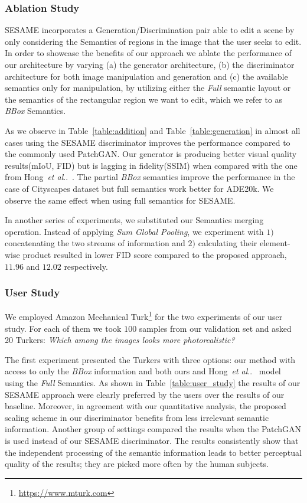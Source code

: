 \documentclass[runningheads]{llncs}
\makeatletter
\DeclareRobustCommand\onedot{\futurelet\@let@token\@onedot}
\def\@onedot{\ifx\@let@token.\else.\null\fi\xspace}
\def\etal{\emph{et al}\onedot}
\def\hong{Hong~\etal~\cite{hong2018learning}}
\newcommand{\tref}[1]{Table~\ref{#1}}
\makeatother
\begin{document}
\subsubsection{Ablation Study}
\label{ssc:ablation_study}


SESAME incorporates a Generation/Discrimination pair able to edit a scene by only considering the Semantics of regions in the image that the user seeks to edit. In order to showcase the benefits of our approach we ablate the performance of our architecture by varying (a) the generator architecture, (b) the discriminator architecture for both image manipulation and generation and (c) the available semantics only for manipulation, by utilizing either the \emph{Full} semantic layout or the semantics of the rectangular region we want to edit, which we refer to as \emph{BBox} Semantics. 

As we observe in \tref{table:addition} and \tref{table:generation} in almost all cases using the SESAME discriminator improves the performance compared to the commonly used PatchGAN. Our generator is producing better visual quality results(mIoU, FID) but is lagging in fidelity(SSIM) when compared with the one from \hong{}. The partial \emph{BBox} semantics improve the performance in the case of Cityscapes dataset but full semantics work better for ADE20k. We observe the same effect when using full semantics for SESAME. 

In another series of experiments, we substituted our Semantics merging operation. Instead of applying \textit{Sum Global Pooling}, we experiment with $1)$ concatenating the two streams of information and $2)$ calculating their element-wise product resulted in lower FID score compared to the proposed approach, $11.96$ and $12.02$ respectively.

\subsubsection{User Study}
\label{ssc:user_study}

We employed Amazon Mechanical Turk\footnote{\url{https://www.mturk.com}} for the two experiments of our user study.
For each of them we took $100$ samples from our validation set and asked 20 Turkers: \textit{Which among the images looks more photorealistic?}

The first experiment presented the Turkers with three options: our method with access to only the \textit{BBox} information and both ours and \hong{} model using the \textit{Full} Semantics. 
As shown in Table~\ref{table:user_study} the results of our SESAME approach were clearly preferred by the users over the results of our baseline. Moreover, in agreement with our quantitative analysis, the proposed scaling scheme in our discriminator benefits from less irrelevant semantic information.
Another group of settings compared the results when the PatchGAN is used instead of our SESAME discriminator. The results consistently show that the independent processing of the semantic information leads to better perceptual quality of the results; they are picked more often by the human subjects.
\end{document}

